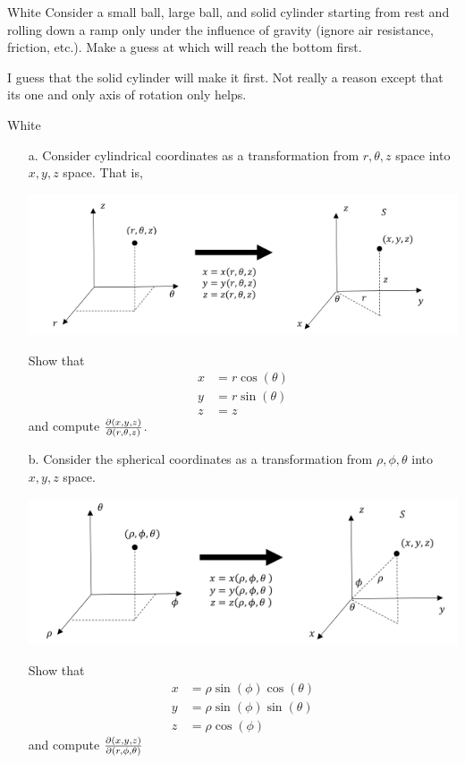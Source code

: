 \documentclass[titlepage]{article}
\begin{document}
\fancyhf{}
\cfoot{\thepage}
\begin{cproblem}{1}{White}
Consider a small ball, large ball, and solid cylinder starting from rest and rolling down a ramp only under the influence of gravity (ignore air resistance, friction, etc.). Make a guess at which will reach the bottom first.
\end{cproblem}
\begin{solution}
I guess that the solid cylinder will make it first. Not really a reason except that its one and only axis of rotation only helps.
\end{solution}
\begin{cproblem}{2}{White}
\ \\ \vspace{-1em}
\begin{itemize}
\item[a.]
Consider cylindrical coordinates as a transformation from $r,\theta,z$ space into $x, y, z$ space. That is,
\begin{center}\includegraphics[scale=.75]{trans1}\end{center}
Show that 
\begin{align*}
x &= r\cos(\theta) \\
y &= r\sin(\theta) \\
z &= z
\end{align*}
and compute $\frac{\partial(x,y,z)}{\partial (r,\theta,z)}$.
\item[b.] 
Consider the spherical coordinates as a transformation from $\rho, \phi, \theta$ into $x,y,z$ space.
\begin{center}
\includegraphics[scale=.75]{trans2}
\end{center}
Show that 
\begin{align*}
x &= \rho\sin(\phi)\cos(\theta)\\
y &= \rho\sin(\phi)\sin(\theta)\\
z &= \rho\cos(\phi)
\end{align*}
and compute $\frac{\partial(x,y,z)}{\partial(r,\phi,\theta)}$
\end{itemize}
\end{cproblem}
\end{document}
